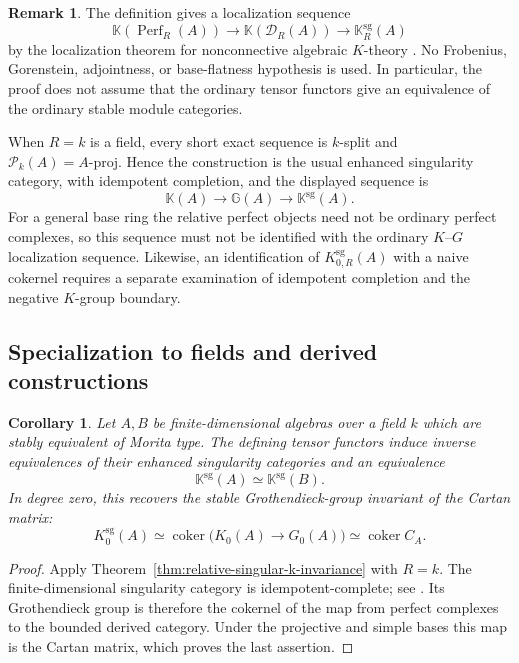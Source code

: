 \documentclass[12pt,a4paper,english,reqno]{amsart}
\numberwithin{equation}{section}
\theoremstyle{plain}
\newtheorem{corollary}[theorem]{Corollary}
\theoremstyle{definition}
\newtheorem{remark}[theorem]{Remark}
\begin{document}
\begin{remark}\label{rem:relative-singular-k-localization}
The definition gives a localization sequence
\[
 \mathbb K(\operatorname{Perf}_R(A))
 \longrightarrow \mathbb K(\mathcal D_R(A))
 \longrightarrow \mathbb K_R^{\mathrm{sg}}(A)
\]
by the localization theorem for nonconnective algebraic $K$-theory
\cite[Section~5 and Theorem~9.8]{BGT2013}. No Frobenius, Gorenstein,
adjointness, or base-flatness hypothesis is used. In particular, the
proof does not assume that the ordinary tensor functors give an
equivalence of the ordinary stable module categories.

When $R=k$ is a field, every short exact sequence is $k$-split and
$\mathcal P_k(A)=A\text{-}\mathrm{proj}$. Hence the construction is
the usual enhanced singularity category, with idempotent completion,
and the displayed sequence is
\[
 \mathbb K(A)\longrightarrow\mathbb G(A)
 \longrightarrow\mathbb K^{\mathrm{sg}}(A).
\]
For a general base ring the relative perfect objects need not be
ordinary perfect complexes, so this sequence must not be identified
with the ordinary $K$--$G$ localization sequence. Likewise, an
identification of $K^{\mathrm{sg}}_{0,R}(A)$ with a naive cokernel
requires a separate examination of idempotent completion and the
negative $K$-group boundary.
\end{remark}

\subsection{Specialization to fields and derived constructions}

\begin{corollary}\label{cor:field-singular-k}
Let $A,B$ be finite-dimensional algebras over a field $k$ which
are stably equivalent of Morita type. The defining tensor functors
induce inverse equivalences of their enhanced singularity categories
and an equivalence
\[
                  \mathbb K^{\mathrm{sg}}(A)
                    \simeq\mathbb K^{\mathrm{sg}}(B).
\]
In degree zero, this recovers the stable Grothendieck-group
invariant of the Cartan matrix:
\[
 K^{\mathrm{sg}}_0(A)\simeq\operatorname{coker}
       \bigl(K_0(A)\longrightarrow G_0(A)\bigr)
       \simeq\operatorname{coker}C_A.
\]
\end{corollary}

\begin{proof}
Apply Theorem~\ref{thm:relative-singular-k-invariance} with $R=k$.
The finite-dimensional singularity category is idempotent-complete;
see \cite[Section~2]{ChenLiuWang2023}. Its Grothendieck group is
therefore the cokernel of the map from perfect complexes to the
bounded derived category. Under the projective and simple bases
this map is the Cartan matrix, which proves the last assertion.
\end{proof}
\end{document}
